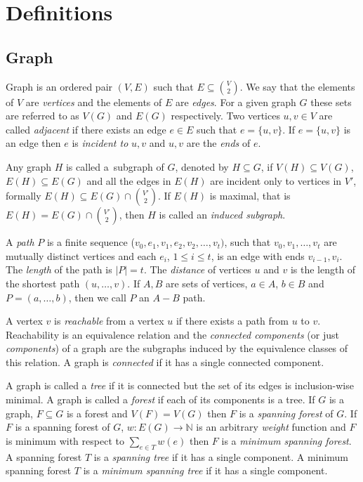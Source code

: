 
\chapter{Definitions}

\section{Graph}
Graph is an ordered pair $(V,E)$ such that $E \subseteq {V \choose 2}$. We say that the elements of $V$ are \textit{vertices} and the elements of $E$ are \textit{edges}. For a given graph $G$ these sets are referred to as $V(G)$ and $E(G)$ respectively. Two vertices $u,v \in V$ are called \textit{adjacent} if there exists an edge $e \in E$ such that $e = \{u,v\}$. If $e = \{u, v\}$ is an edge then $e$ is \textit{incident to} $u,v$ and $u,v$ are the \textit{ends} of $e$.

Any graph $H$ is called a~subgraph of $G$, denoted by $H \subseteq G$, if $V(H) \subseteq V(G)$, $E(H) \subseteq E(G)$ and all the edges in $E(H)$ are incident only to vertices in $V'$, formally $E(H) \subseteq E(G) \cap {V' \choose 2}$. If $E(H)$ is maximal, that is $E(H) = E(G) \cap { V' \choose 2 }$, then $H$ is called an \textit{induced subgraph}.

A \textit{path} $P$ is a finite sequence ($v_0,e_1,v_1,e_2,v_2,\ldots,v_t)$, such that $v_0, v_1,\ldots,v_t$ are mutually distinct vertices and each $e_i$, $1 \leq i \leq t$, is an edge with ends $v_{i-1}, v_i$. The \textit{length} of the path is $\lvert P \rvert = t$. The \textit{distance} of vertices $u$ and $v$ is the length of the shortest path $(u,\ldots,v)$. If $A,B$ are sets of vertices, $a \in A$, $b \in B$ and $P = (a,\ldots,b)$, then we call $P$ an $A{-}B$ path.

A vertex $v$ is \textit{reachable} from a vertex $u$ if there exists a path from $u$ to $v$. Reachability is an equivalence relation and the \textit{connected components} (or just \textit{components}) of a graph are the subgraphs induced by the equivalence classes of this relation. A graph is \textit{connected} if it has a single connected component.

A graph is called a \textit{tree} if it is connected but the set of its edges is inclusion-wise minimal. A graph is called a \textit{forest} if each of its components is a tree. If $G$ is a graph, $F \subseteq G$ is a forest and $V(F) = V(G)$ then $F$ is a \textit{spanning forest} of $G$. If $F$ is a spanning forest of $G$, $w : E(G) \rightarrow \mathbb{N}$ is an arbitrary \textit{weight} function and $F$ is minimum with respect to $\sum_{e \in T} w(e)$ then $F$ is a \textit{minimum spanning forest}. A spanning forest $T$ is a \textit{spanning tree} if it has a single component. A minimum spanning forest $T$ is a \textit{minimum spanning tree} if it has a single component.


